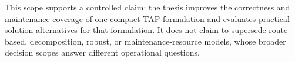This scope supports a controlled claim: the thesis improves the correctness and
maintenance coverage of one compact TAP formulation and evaluates practical
solution alternatives for that formulation. It does not claim to supersede
route-based, decomposition, robust, or maintenance-resource models, whose
broader decision scopes answer different operational questions.
